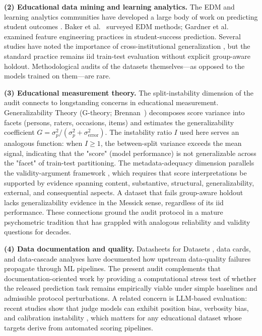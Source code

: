 \documentclass[10pt,letterpaper]{article}
\begin{document}
\textbf{(2) Educational data mining and learning analytics.} The EDM and learning analytics communities have developed a large body of work on predicting student outcomes \citep{Romero2020}. Baker et al.~\citep{Baker2014} surveyed EDM methods; Gardner et al.~\citep{Gardner2019} examined feature engineering practices in student-success prediction. Several studies have noted the importance of cross-institutional generalization \citep{Chejara2023,Chejara2024}, but the standard practice remains iid train-test evaluation without explicit group-aware holdout. Methodological audits of the datasets themselves---as opposed to the models trained on them---are rare.

\textbf{(3) Educational measurement theory.} The split-instability dimension of the audit connects to longstanding concerns in educational measurement. Generalizability Theory (G-theory; Brennan~\citep{Brennan2001}) decomposes score variance into facets (persons, raters, occasions, items) and estimates the generalizability coefficient $G = \sigma^2_p / (\sigma^2_p + \sigma^2_{\text{error}})$. The instability ratio $I$ used here serves an analogous function: when $I \geq 1$, the between-split variance exceeds the mean signal, indicating that the "score" (model performance) is not generalizable across the "facet" of train-test partitioning. The metadata-adequacy dimension parallels the validity-argument framework \citep{Messick1995,Kane2006}, which requires that score interpretations be supported by evidence spanning content, substantive, structural, generalizability, external, and consequential aspects. A dataset that fails group-aware holdout lacks generalizability evidence in the Messick sense, regardless of its iid performance. These connections ground the audit protocol in a mature psychometric tradition that has grappled with analogous reliability and validity questions for decades.

\textbf{(4) Data documentation and quality.} Datasheets for Datasets \citep{Gebru2021}, data cards, and data-cascade analyses \citep{Sambasivan2021} have documented how upstream data-quality failures propagate through ML pipelines. The present audit complements that documentation-oriented work by providing a computational stress test of whether the released prediction task remains empirically viable under simple baselines and admissible protocol perturbations. A related concern is LLM-based evaluation: recent studies show that judge models can exhibit position bias, verbosity bias, and calibration instability \citep{Zheng2023,Wang2024,Huang2024llm}, which matters for any educational dataset whose targets derive from automated scoring pipelines.
\end{document}
